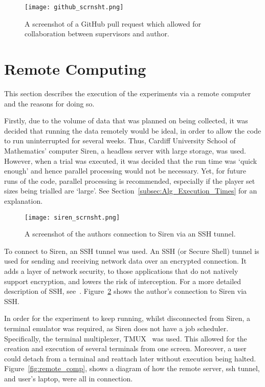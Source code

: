 \begin{figure}
    \centering
    \texttt{[image: github\_scrnsht.png]}
    \caption{A screenshot of a GitHub pull request which allowed for collaboration between supervisors and author.}\label{fig:github_scrnsht}
\end{figure}


\section{Remote Computing}\label{sec:Remote_Computing}
This section describes the execution of the experiments via a remote
computer and the reasons for doing so.

Firstly, due to the volume of data that was planned on being collected, it was
decided that running the data remotely would be ideal, in order to allow the
code to run uninterrupted for several weeks. Thus, Cardiff University School of
Mathematics' computer Siren, a headless server with large storage, was used. However, when a trial was executed,
it was decided that the run time was `quick enough' and hence parallel
processing would not be necessary. Yet, for future runs of the code, parallel
processing is recommended, especially if the player set sizes being trialled are
`large'. See Section~\ref{subsec:Alg_Execution_Times} for an explanation.

\begin{figure}
    \centering
    \texttt{[image: siren\_scrnsht.png]}
    \caption{A screenshot of the authors connection to Siren via an SSH tunnel.}\label{fig:siren_scrnsht}
\end{figure}


To connect to Siren, an SSH tunnel was used. An SSH (or Secure Shell) tunnel is
used for sending and receiving network data over an encrypted connection. It adds
a layer of network security, to those applications that do not natively support
encryption, and lowers the risk of interception. For a more detailed description
of SSH, see~\cite{SSH.COM2016}. Figure~\ref{fig:siren_scrnsht} shows the author's
connection to Siren via SSH\@. 


In order for the experiment to keep running, whilst disconnected
from Siren, a terminal emulator was required, as Siren does not have a job
scheduler. Specifically, the terminal multiplexer, TMUX~\cite{Marriott} was used. This allowed
for the creation and execution of several terminals from one screen. Moreover, a
user could detach from a terminal and reattach later without execution being
halted. Figure~\ref{fig:remote_comp}, shows a diagram of how the remote server, ssh tunnel, and user's
laptop, were all in connection.

